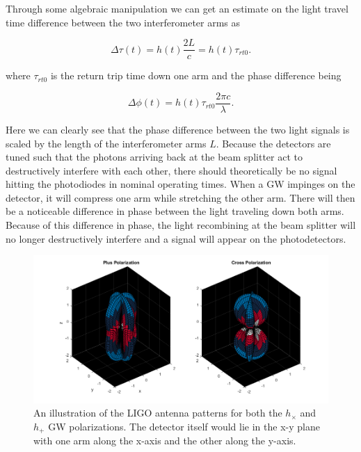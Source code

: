 Through some algebraic manipulation we can get an estimate on the 
light travel time difference between the two interferometer 
arms as 

\begin{equation}
    \Delta \tau(t) = h(t) \frac{2L}{c} = h(t) \tau_{rt0}.
\end{equation}

%
%
where $\tau_{rt0}$ is the return trip time down 
one arm and the phase difference being 

\begin{equation}
    \Delta \phi(t) = h(t) \tau_{rt0} \frac{2\pi c}{\lambda}.
\end{equation}

Here we can clearly see that the phase difference 
between the two light signals is scaled by the 
length of the interferometer arms $L$. Because the 
detectors are tuned such that the photons arriving 
back at the beam splitter act to destructively 
interfere with each other, there should theoretically 
be no signal hitting the photodiodes in nominal operating times. When a \ac{GW} 
impinges on the detector, it will compress one arm 
while stretching the other arm. There will then be a 
noticeable difference in phase between the light traveling 
down both arms. Because of this difference in phase, the 
light recombining at the beam splitter will no longer 
destructively interfere and a signal will appear 
on the photodetectors.

\begin{figure}
    \centering
    \includegraphics[width=\linewidth]{figures/peanut.png}
    \caption{An illustration of the \ac{LIGO} antenna patterns for both the $h_\times$ and $h_+$ \ac{GW} polarizations. The detector itself would lie in the x-y plane with one arm along the x-axis and the other along the y-axis.}
    \label{fig:gw_plus_cross}
\end{figure}

